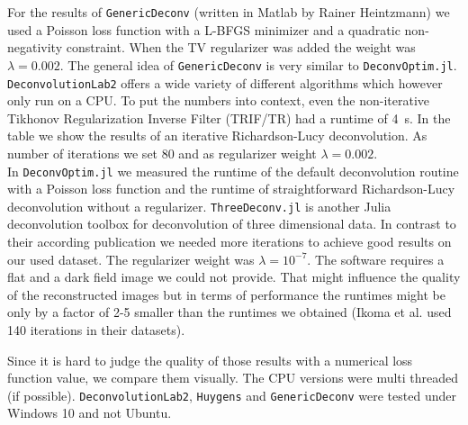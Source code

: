 \documentclass{juliacon}
\begin{document}
        For the results of \verb|GenericDeconv| (written in Matlab by Rainer Heintzmann) we used a Poisson loss function with a L-BFGS minimizer 
        and a quadratic non-negativity constraint.
        When the TV regularizer was added the weight was $\lambda = 0.002$.
        The general idea of \verb|GenericDeconv| is very similar to \verb|DeconvOptim.jl|.
        \verb|DeconvolutionLab2| offers a wide variety of different algorithms which however only run on a CPU. 
        To put the numbers into context, even the non-iterative Tikhonov Regularization Inverse Filter (TRIF/TR) had a 
        runtime of \SI{4}{\second}. In the table we show the results of an 
        iterative Richardson-Lucy deconvolution. As number of iterations we set 80 and as regularizer weight $\lambda=0.002$.\\
        In \verb|DeconvOptim.jl| we measured the runtime of the default deconvolution routine with a Poisson loss function
        and the runtime of straightforward Richardson-Lucy deconvolution without a regularizer.
        \verb|ThreeDeconv.jl| is another Julia deconvolution toolbox for deconvolution of three dimensional data.
        In contrast to their according publication \cite{ikoma2018convex} we needed more iterations to achieve good results
        on our used dataset. The regularizer weight was $\lambda=10^{-7}$. 
        The software requires a flat and a dark field image we could not provide. That might influence the quality of the reconstructed images
        but in terms of performance the runtimes might be only by a factor of 2-5 smaller than the runtimes we obtained (Ikoma et al. used 140 iterations in their datasets).

        Since it is hard to judge the quality of those results with a numerical loss function value, we compare them visually.
        The CPU versions were multi threaded (if possible). \verb|DeconvolutionLab2|, \verb|Huygens| and \verb|GenericDeconv| were tested under Windows 10 and not Ubuntu.
\end{document}
